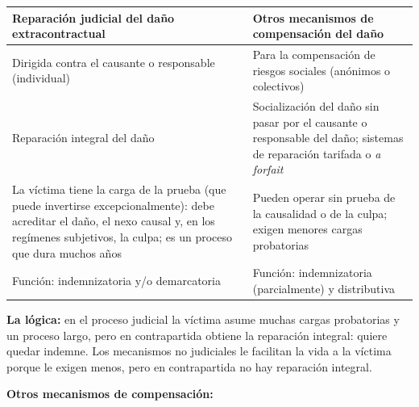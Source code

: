 \begin{tabla}
\begin{longtable}{|>{\raggedright\arraybackslash}m{}|>{\raggedright\arraybackslash}m{}|}
\hline
\cellcolor[HTML]{1F3864}\textcolor[HTML]{FFFFFF}{\textbf{Reparación judicial del daño extracontractual}} & \cellcolor[HTML]{1F3864}\textcolor[HTML]{FFFFFF}{\textbf{Otros mecanismos de compensación del daño}} \\ \hline
Dirigida contra el causante o responsable (individual) & Para la compensación de riesgos sociales (anónimos o colectivos) \\ \hline
\cellcolor[HTML]{F2F5FA}Reparación integral del daño & \cellcolor[HTML]{F2F5FA}Socialización del daño sin pasar por el causante o responsable del daño; sistemas de reparación tarifada o \textit{a forfait} \\ \hline
La víctima tiene la carga de la prueba (que puede invertirse excepcionalmente): debe acreditar el daño, el nexo causal y, en los regímenes subjetivos, la culpa; es un proceso que dura muchos años & Pueden operar sin prueba de la causalidad o de la culpa; exigen menores cargas probatorias \\ \hline
\cellcolor[HTML]{F2F5FA}Función: indemnizatoria y/o demarcatoria & \cellcolor[HTML]{F2F5FA}Función: indemnizatoria (parcialmente) y distributiva \\ \hline
\end{longtable}
\end{tabla}
\textbf{La lógica:} en el proceso judicial la víctima asume muchas cargas probatorias y un proceso largo, pero en contrapartida obtiene la reparación integral: quiere quedar indemne. Los mecanismos no judiciales le facilitan la vida a la víctima porque le exigen menos, pero en contrapartida no hay reparación integral.

\textbf{Otros mecanismos de compensación:}

